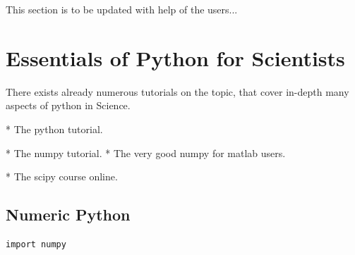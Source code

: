 \documentclass{report}
\begin{document}
This section is to be updated with help of the users...















\chapter{Essentials of Python for Scientists}
There exists already numerous tutorials on the topic, that cover in-depth many aspects of python in Science.

*  The python tutorial.

*  The numpy tutorial.
*  The very good numpy for matlab users.

* The scipy course online.



\section{Numeric Python}
\begin{lstlisting}
import numpy

\end{lstlisting}
\end{document}
